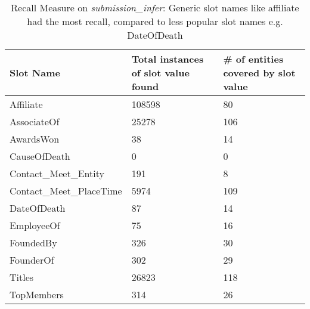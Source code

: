 \begin{table*}    
\caption{Recall Measure on \textit{submission\_infer}: Generic slot names like affiliate had the most recall, compared to less popular slot names e.g. DateOfDeath}
\centering
\label{table:finalresultrecall}
\begin{tabular}{|l|p{3.5cm}|p{4cm}|}
\hline 
 \textbf{Slot Name} & \textbf{Total instances of slot value found} & \textbf{\# of entities covered by slot value} \\ 
\hline 
Affiliate & 108598 & 80 \\ \hline 
AssociateOf & 25278 & 106 \\ \hline 
AwardsWon & 38 & 14 \\ \hline 
CauseOfDeath & 0 & 0 \\ \hline 
Contact\_Meet\_Entity & 191 & 8 \\ \hline 
Contact\_Meet\_PlaceTime & 5974 & 109 \\ \hline 
DateOfDeath & 87 & 14 \\ \hline 
EmployeeOf & 75 & 16 \\ \hline 
FoundedBy & 326 & 30 \\ \hline 
FounderOf & 302 &  29 \\ \hline 
Titles & 26823 & 118 \\ \hline 
TopMembers & 314 & 26 \\ \hline 

\end{tabular} 
\end{table*}

